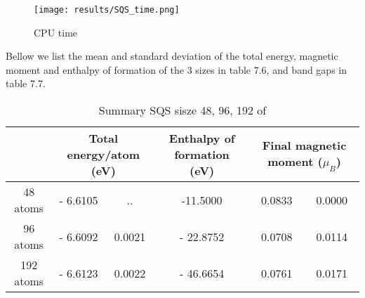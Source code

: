 \begin{figure}[H]
\centering
\texttt{[image: results/SQS\_time.png]}
\caption{CPU time}
\end{figure}

Bellow we list the mean and standard deviation of the total energy, magnetic moment and enthalpy of formation of the 3 sizes in table 7.6, and band gaps in table 7.7. 

\begin{table}[H]
\hskip-2cm\begin{tabular}{@{}cccccc@{}}
\toprule
       & \multicolumn{2}{c}{Total energy/atom (eV)} & Enthalpy of formation (eV) & \multicolumn{2}{c}{Final magnetic moment ($\mu_B$)} \\ \midrule
48 atoms & - 6.6105 & .. & -11.5000 & 0.0833 & 0.0000    \\
96 atoms & - 6.6092  & 0.0021 & - 22.8752  & 0.0708  & 0.0114     \\
192 atoms & - 6.6123  & 0.0022 & - 46.6654 & 0.0761 & 0.0171     \\ \bottomrule
\end{tabular}
\caption{Summary SQS sisze 48, 96, 192 of }
\end{table}


